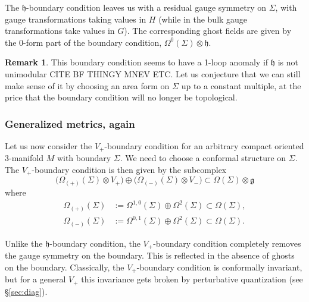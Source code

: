 \documentclass[a4paper]{amsart}
\theoremstyle{plain}
\theoremstyle{definition}
\newtheorem*{rem}{Remark}
\newcommand{\g}{\mathfrak{g}}
\newcommand{\h}{\mathfrak{h}}
\newcommand{\la}{\langle}
\newcommand{\ra}{\rangle}
\begin{document}
The $\h$-boundary condition leaves us with a residual gauge symmetry on $\Sigma$, with gauge transformations taking values in $H$ (while in the bulk gauge transformations take values in $G$). The corresponding ghost fields are given by the 0-form part of the boundary condition, $\Omega^0(\Sigma)\otimes\h$.

\begin{rem}
This boundary condition seems to have a 1-loop anomaly if $\h$ is not unimodular {\color{red} CITE BF THINGY MNEV ETC}. Let us conjecture that we can still make sense of it by choosing an area form on $\Sigma$ up to a constant multiple, at the price that the boundary condition will no longer be topological. 
\end{rem}

\subsubsection{Generalized metrics, again}\label{subsubsec:generalized_metrics_bc}
Let us now consider the $V_+$-boundary condition for an arbitrary compact oriented 3-manifold $M$ with boundary $\Sigma$. 
We need to choose a conformal structure on $\Sigma$. 
The $V_+$-boundary condition is then given by the subcomplex
$$\bigl(\Omega_{(+)}(\Sigma)\otimes V_+\bigr) \oplus \bigl(\Omega_{(-)}(\Sigma)\otimes V_-\bigr) \subset\Omega(\Sigma)\otimes\g$$
where
\begin{align*}
\Omega_{(+)}(\Sigma)&:=\Omega^{1,0}(\Sigma)\oplus\Omega^2(\Sigma)\subset\Omega(\Sigma),\\
\Omega_{(-)}(\Sigma)&:=\Omega^{0,1}(\Sigma)\oplus\Omega^2(\Sigma)\subset\Omega(\Sigma).
\end{align*}


Unlike the $\h$-boundary condition, the $V_+$-boundary condition completely removes the gauge symmetry on the boundary. This is reflected in the absence of ghosts on the boundary. Classically, the $V_+$-boundary condition is conformally invariant, but for a general $V_+$ this invariance gets broken by perturbative quantization (see \S\ref{sec:diag}).
\end{document}
